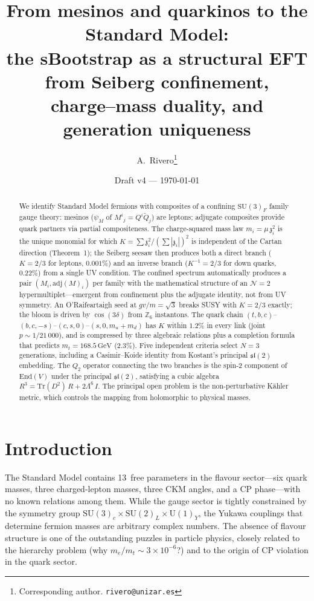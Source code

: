 \documentclass[12pt,a4paper]{article}
\title{From mesinos and quarkinos to the Standard Model:\\
  the sBootstrap as a structural EFT from Seiberg confinement,\\
  charge--mass duality, and generation uniqueness}
\author{A.\ Rivero\thanks{Corresponding author. \texttt{rivero@unizar.es}}}
\date{Draft v4 --- \today}
\newcommand{\SU}{\mathrm{SU}}
\newcommand{\UU}{\mathrm{U}}
\newcommand{\Tr}{\mathrm{Tr}}
\newcommand{\adj}{\mathrm{adj}}
\newcommand{\GeV}{\,\mathrm{GeV}}
\newcommand{\zch}{\mathfrak{z}}
\begin{document}
\maketitle

\begin{abstract}
We identify Standard Model fermions with composites of a
confining $\SU(3)_F$ family gauge theory: mesinos
($\psi_M$ of $M^i{}_j = Q^i\tilde{Q}_j$) are leptons;
adjugate composites provide quark partners via partial
compositeness.
The charge-squared mass law $m_i = \mu\,\zch_i^2$ is the
unique monomial for which $K = \sum\zch_i^2/(\sum|\zch_i|)^2$
is independent of the Cartan direction (Theorem~1);
the Seiberg seesaw then produces both a direct branch
($K = 2/3$ for leptons, $0.001\%$) and an inverse branch
($K^{-1} = 2/3$ for down quarks, $0.22\%$) from a single UV
condition.
The confined spectrum automatically produces a pair
$(M_i, \adj(M)_i)$ per family with the mathematical structure
of an $\mathcal{N}{=}2$ hypermultiplet---emergent from
confinement plus the adjugate identity, not from UV symmetry.
An O'Raifeartaigh seed at $gv/m = \sqrt{3}$ breaks SUSY with
$K = 2/3$ exactly; the bloom is driven by $\cos(3\delta)$
from $\mathbb{Z}_{6}$ instantons.
The quark chain
$(t,b,c)$--$(b,c,-s)$--$(c,s,0)$--$(s,0,m_u{+}m_d)$
has $K$ within $1.2\%$ in every link (joint $p \sim 1/21\,000$),
and is compressed by three algebraic relations plus a
completion formula that predicts $m_t = 168.5\GeV$ ($2.3\%$).
Five independent criteria select $N = 3$ generations, including
a Casimir--Koide identity from Kostant's principal
$\mathfrak{sl}(2)$ embedding.
The $Q_2$ operator connecting the two branches is the
spin-2 component of $\mathrm{End}(V)$ under the principal
$\mathfrak{sl}(2)$, satisfying a cubic algebra
$R^3 = \Tr(D^2)\,R + 2\Lambda^6\,I$.
The principal open problem is the non-perturbative K\"ahler
metric, which controls the mapping from holomorphic to physical
masses.
\end{abstract}


\section{Introduction}
\label{sec:intro}

The Standard Model contains 13~free parameters in the flavour
sector---six quark masses, three charged-lepton masses, three CKM
angles, and a CP phase---with no known relations among them.
While the gauge sector is tightly constrained by the symmetry
group $\SU(3)_c \times \SU(2)_L \times \UU(1)_Y$, the Yukawa
couplings that determine fermion masses are arbitrary complex
numbers.
The absence of flavour structure is one of the outstanding
puzzles in particle physics, closely related to the hierarchy
problem (why $m_e/m_t \sim 3 \times 10^{-6}$?) and to the
origin of CP violation in the quark sector.
\end{document}
